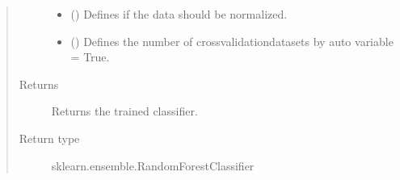 \documentclass[letterpaper,10pt,english]{sphinxmanual}
\begin{document}
\begin{fulllineitems}
\begin{quote}
\begin{description}
\begin{itemize}
\item {} 
\sphinxAtStartPar
{} (\sphinxstyleliteralemphasis{\sphinxupquote{, }}) \textendash{} Defines if the data should be normalized.

\item {} 
\sphinxAtStartPar
{} (\sphinxstyleliteralemphasis{\sphinxupquote{, }}) \textendash{} Defines the number of cross\sphinxhyphen{}validation\sphinxhyphen{}datasets by auto variable = True.

\end{itemize}

\item[{Returns}] \leavevmode
\sphinxAtStartPar
Returns the trained classifier.

\item[{Return type}] \leavevmode
\sphinxAtStartPar
sklearn.ensemble.RandomForestClassifier

\end{description}\end{quote}

\end{fulllineitems}

\end{document}
